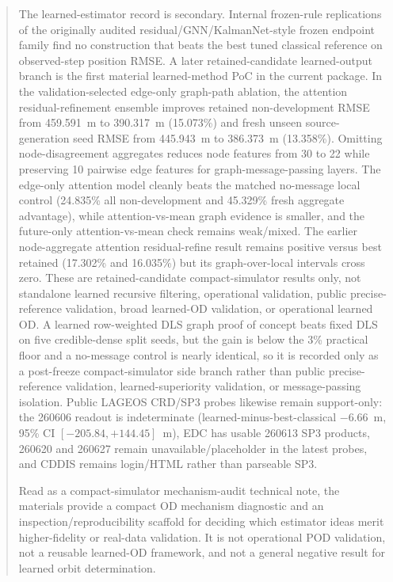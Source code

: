 \documentclass{article}
\begin{document}
\begin{abstract}
The learned-estimator record is secondary. Internal frozen-rule replications of the originally audited residual/GNN/KalmanNet-style frozen endpoint family find no construction that beats the best tuned classical reference on observed-step position RMSE. A later retained-candidate learned-output branch is the first material learned-method PoC in the current package. In the validation-selected edge-only graph-path ablation, the attention residual-refinement ensemble improves retained non-development RMSE from 459.591~m to 390.317~m (15.073\%) and fresh unseen source-generation seed RMSE from 445.943~m to 386.373~m (13.358\%). Omitting node-disagreement aggregates reduces node features from 30 to 22 while preserving 10 pairwise edge features for graph-message-passing layers. The edge-only attention model cleanly beats the matched no-message local control (24.835\% all non-development and 45.329\% fresh aggregate advantage), while attention-vs-mean graph evidence is smaller, and the future-only attention-vs-mean check remains weak/mixed. The earlier node-aggregate attention residual-refine result remains positive versus best retained (17.302\% and 16.035\%) but its graph-over-local intervals cross zero. These are retained-candidate compact-simulator results only, not standalone learned recursive filtering, operational validation, public precise-reference validation, broad learned-OD validation, or operational learned OD. A learned row-weighted DLS graph proof of concept beats fixed DLS on five credible-dense split seeds, but the gain is below the 3\% practical floor and a no-message control is nearly identical, so it is recorded only as a post-freeze compact-simulator side branch rather than public precise-reference validation, learned-superiority validation, or message-passing isolation. Public LAGEOS CRD/SP3 probes likewise remain support-only: the 260606 readout is indeterminate (learned-minus-best-classical $-6.66$~m, 95\% CI $[-205.84,+144.45]$~m), EDC has usable 260613 SP3 products, 260620 and 260627 remain unavailable/placeholder in the latest probes, and CDDIS remains login/HTML rather than parseable SP3.

Read as a compact-simulator mechanism-audit technical note, the materials provide a compact OD mechanism diagnostic and an inspection/reproducibility scaffold for deciding which estimator ideas merit higher-fidelity or real-data validation. It is not operational POD validation, not a reusable learned-OD framework, and not a general negative result for learned orbit determination.

\end{abstract}
\end{document}
